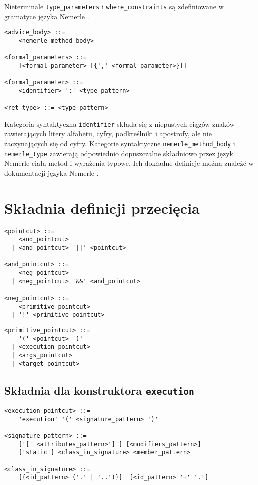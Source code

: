 \documentclass[a4paper,12pt]{mwbk}
\begin{document}
Nieterminale \lstinline!type_parameters! i \lstinline!where_constraints!
są zdefiniowane w gramatyce języka Nemerle \cite{nemerle}.

\begin{lstlisting}[style=grammar]
<advice_body> ::=
    <nemerle_method_body>

<formal_parameters> ::= 
    [<formal_parameter> [{',' <formal_parameter>}]]

<formal_parameter> ::=
    <identifier> ':' <type_pattern>

<ret_type> ::= <type_pattern>
\end{lstlisting}

Kategoria syntaktyczna \lstinline!identifier! składa się z niepustych ciągów
znaków zawierających litery alfabetu, cyfry, podkreślniki i apostrofy, ale nie
zaczynających się od cyfry. Kategorie syntaktyczne
\lstinline!nemerle_method_body!  i \lstinline!nemerle_type! zawierają
odpowiednio dopuszczalne składniowo przez język Nemerle ciała metod i wyrażenia
typowe. Ich dokładne definicje można znaleźć w dokumentacji języka Nemerle
\cite{nemerle}.

\section{Składnia definicji przecięcia}


\begin{lstlisting}[style=grammar]
<pointcut> ::= 
    <and_pointcut> 
  | <and_pointcut> '||' <pointcut>

<and_pointcut> ::= 
    <neg_pointcut> 
  | <neg_pointcut> '&&' <and_pointcut>

<neg_pointcut> ::=
    <primitive_pointcut>
  | '!' <primitive_pointcut>
\end{lstlisting}

\begin{lstlisting}[style=grammar]
<primitive_pointcut> ::=
    '(' <pointcut> ')'
  | <execution_pointcut>
  | <args_pointcut>
  | <target_pointcut>
\end{lstlisting}


\subsection{Składnia dla konstruktora \lstinline!execution!}\label{class_in_signature_syntax}

\begin{lstlisting}[style=grammar]
<execution_pointcut> ::=
    'execution' '(' <signature_pattern> ')'

<signature_pattern> ::=
    ['[' <attributes_pattern>']'] [<modifiers_pattern>] 
    ['static'] <class_in_signature> <member_pattern>

<class_in_signature> ::=
    [{<id_pattern> ('.' | '..')}]  [<id_pattern> '+' '.']
\end{lstlisting}
\end{document}
